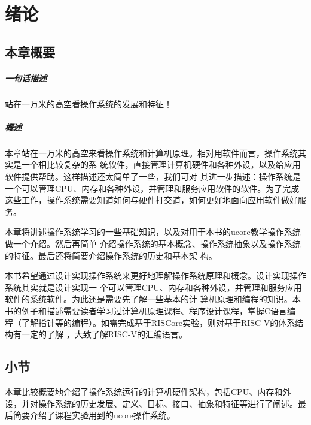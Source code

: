 
\chapter{绪论}\label{ch_intro}

\section{本章概要}

\paragraph{一句话描述}

站在一万米的高空看操作系统的发展和特征！

\paragraph{概述}

本章站在一万米的高空来看操作系统和计算机原理。相对用软件而言，操作系统其实是一个相比较复杂的系
统软件，直接管理计算机硬件和各种外设，以及给应用软件提供帮助。这样描述还太简单了一些，我们可对
其进一步描述：操作系统是一个可以管理CPU、内存和各种外设，并管理和服务应用软件的软件。为了完成
这些工作，操作系统需要知道如何与硬件打交道，如何更好地面向应用软件做好服务。

本章将讲述操作系统学习的一些基础知识，以及对用于本书的ucore教学操作系统做一个介绍。然后再简单
介绍操作系统的基本概念、操作系统抽象以及操作系统的特征。最后还将简要介绍操作系统的历史和基本架
构。

本书希望通过设计实现操作系统来更好地理解操作系统原理和概念。设计实现操作系统其实就是设计实现一
个可以管理CPU、内存和各种外设，并管理和服务应用软件的系统软件。为此还是需要先了解一些基本的计
算机原理和编程的知识。本书的例子和描述需要读者学习过计算机原理课程、程序设计课程，掌握C语言编
程（了解指针等的编程）。如需完成基于RISCore实验，则对基于RISC-V的体系结构有一定的了解
，大致了解RISC-V的汇编语言。






\section{小节}
本章比较概要地介绍了操作系统运行的计算机硬件架构，包括CPU、内存和外设，并对操作系统的历史发展、定义、目标、接口、抽象和特征等进行了阐述。最后简要介绍了课程实验用到的ucore操作系统。